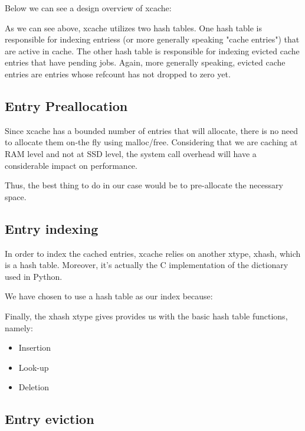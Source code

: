 Below we can see a design overview of xcache:


As we can see above, xcache utilizes two hash tables. One hash table is 
responsible for indexing entriess (or more generally speaking "cache entries") 
that are active in cache.  The other hash table is responsible for indexing 
evicted cache entries that have pending jobs.  Again, more generally speaking, 
evicted cache entries are entries whose refcount has not dropped to zero yet.

\subsection{Entry Preallocation}

Since xcache has a bounded number of entries that will allocate, there is no 
need to allocate them on-the fly using malloc/free. Considering that we are 
caching at RAM level and not at SSD level, the system call overhead will have a 
considerable impact on performance.

Thus, the best thing to do in our case would be to pre-allocate the necessary 
space.

\subsection{Entry indexing}

In order to index the cached entries, xcache relies on another xtype, xhash, 
which is a hash table. Moreover, it's actually the C implementation of the 
dictionary used in Python.

We have chosen to use a hash table as our index because:

Finally, the xhash xtype gives provides us with the basic hash table functions, 
namely:

\begin{itemize}
	\item Insertion
	\item Look-up
	\item Deletion
\end{itemize}

\subsection{Entry eviction}

